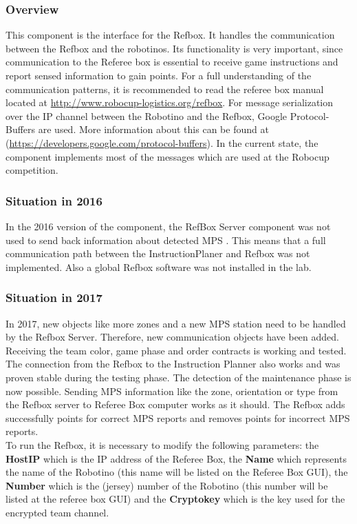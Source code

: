 \subsubsection{Overview}

This component is the interface for the Refbox. It handles the communication between the Refbox and the robotinos. Its functionality is very important, since communication to the Referee box is essential to receive game instructions and report sensed information to gain points. For a full understanding of the communication patterns, it is recommended to read the referee box manual located at \url{ http://www.robocup-logistics.org/refbox}. For message serialization over the IP channel between the Robotino and the Refbox, Google Protocol-Buffers are used. More information about this can be found at (\url{https://developers.google.com/protocol-buffers}). In the current state, the component implements most of the messages which are used at the Robocup competition.

\subsubsection{Situation in 2016}

In the 2016 version of the component, the RefBox Server component was not used to send back information about detected MPS \cite{BOK}. This means that a full communication path between the InstructionPlaner and Refbox was not implemented. Also a global Refbox software was not installed in the lab. 


\subsubsection{Situation in 2017}

In 2017, new objects like more zones and a new MPS station need to be handled by the Refbox Server. Therefore, new communication objects have been added. Receiving the team color, game phase and order contracts is working and tested. The connection from the Refbox to the Instruction Planner also works and was proven stable during the testing phase. The detection of the maintenance phase is now possible. Sending MPS information like the zone, orientation or type from the Refbox server to Referee Box computer works as it should. The Refbox adds successfully points for correct MPS reports and removes points for incorrect MPS reports. \\

To run the Refbox, it is necessary to modify the following parameters: the \textbf{HostIP} which is the IP address of the Referee Box, the \textbf{Name} which represents the name of the Robotino (this name will be listed on the Referee Box GUI), the \textbf{Number} which is the (jersey) number of the Robotino (this number will be listed at the referee box GUI) and the \textbf{Cryptokey} which is the key used for the encrypted team channel.\\

